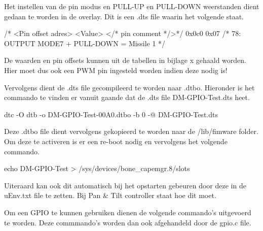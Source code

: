 Het instellen van de pin modus en PULL-UP en PULL-DOWN weerstanden dient gedaan te
worden in de overlay. Dit is een .dts file waarin het volgende staat.

\begin{cppcode}
/* <Pin offset adres> <Value> </* pin comment */>*/
          0x0c0        0x07    /* 78: OUTPUT MODE7 + PULL-DOWN = Missile 1     */
\end{cppcode}

De waarden en pin offsets kunnen uit de tabellen in bijlage x gehaald worden. Hier
moet dus ook een PWM pin ingesteld worden indien deze nodig is!

Vervolgens dient de .dts file gecompileerd te worden naar .dtbo. Hieronder is het
commando te vinden er vanuit gaande dat de .dts file DM-GPIO-Test.dts heet.

\begin{cppcode}
dtc -O dtb -o DM-GPIO-Test-00A0.dtbo -b 0 -@ DM-GPIO-Test.dts
\end{cppcode}

Deze .dtbo file dient vervolgens gekopieerd te worden naar de /lib/fimware folder.
Om deze te activeren is er een re-boot nodig en vervolgens het volgende commando.

\begin{cppcode}
echo DM-GPIO-Test > /sys/devices/bone_capemgr.8/slots
\end{cppcode}

Uiteraard kan ook dit automatisch bij het opstarten gebeuren door deze in de
uEnv.txt file te zetten. Bij Pan \& Tilt controller staat hoe dit moet.

Om een GPIO te kunnen gebruiken dienen de volgende commando's uitgevoerd te worden.
Deze commmando's worden dan ook afgehandeld door de gpio.c file.


